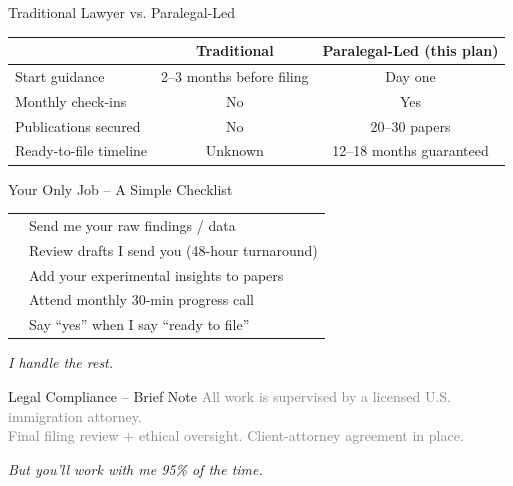 \documentclass[aspectratio=169, 10pt]{beamer}
\begin{document}
	\begin{frame}{Traditional Lawyer vs. Paralegal-Led}
		\begin{table}
			\centering
			\scriptsize
			\begin{tabular}{lcc}
				\toprule
				& \textbf{Traditional} & \textbf{Paralegal-Led (this plan)} \\
				\midrule
				Start guidance & 2–3 months before filing & Day one \\
				Monthly check-ins & No & Yes \\
				Publications secured & No & 20–30 papers \\
				Ready-to-file timeline & Unknown & 12–18 months guaranteed \\
				\bottomrule
			\end{tabular}
		\end{table}
	\end{frame}
	
	\begin{frame}{Your Only Job – A Simple Checklist}
		\centering
		\large
		\begin{tabular}{p{0.8cm}p{8cm}}
			\faCheckSquare & Send me your raw findings / data \\
			\faCheckSquare & Review drafts I send you (48-hour turnaround) \\
			\faCheckSquare & Add your experimental insights to papers \\
			\faCheckSquare & Attend monthly 30-min progress call \\
			\faCheckSquare & Say “yes” when I say “ready to file” \\
		\end{tabular}
		
		\vspace{0.5cm}
		
		\vspace{0.3cm}
		\textit{I handle the rest.}
	\end{frame}
	
	\begin{frame}{Legal Compliance – Brief Note}
		\centering
		{\tiny \textcolor{gray}{All work is supervised by a licensed U.S. immigration attorney.}\\
			\textcolor{gray}{Final filing review + ethical oversight. Client-attorney agreement in place.}}
		
		\vspace{0.3cm}
		\textcolor{accentgold}{\textit{But you’ll work with me 95\% of the time.}}
	\end{frame}
	
\end{document}
